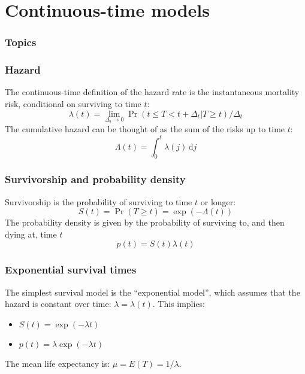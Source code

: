 \documentclass[color=usenames,dvipsnames]{beamer}\usepackage[]{graphicx}\usepackage[]{xcolor}
\begin{document}
\section{Continuous-time models}



\begin{frame}[plain]
  \frametitle{Topics}
  \Large
  \tableofcontents[currentsection]
\end{frame}


\begin{frame}
  \frametitle{Hazard}
  The continuous-time definition of the hazard rate is the
  instantaneous mortality risk, conditional on surviving to time $t$:
  \[
    \lambda(t) = \lim_{\Delta_t \to 0} \Pr(t \le T < t+\Delta_t | T\ge t)/\Delta_t
  \]
  \pause
  \vfill
  The cumulative hazard can be thought of as the sum of the risks up
  to time $t$:
  \[
    \Lambda(t) = \int_{0}^t \lambda(j) \,\mathrm{d}j
  \]
\end{frame}


\begin{frame}
  \frametitle{Survivorship and probability density}
  Survivorship is the probability of surviving to time $t$ or longer:
  \[
    S(t) = \Pr(T \ge t) = \exp(-\Lambda(t))
    \]
  \pause
  \vfill
  The probability density is given by the probability of surviving to,
  and then dying at, time $t$
  \[
    p(t) = S(t)\lambda(t) %
  \]
\end{frame}



\begin{frame}
  \frametitle{Exponential survival times}
  The simplest survival model is the ``exponential model'',
  which assumes that the hazard is constant over
  time: $\lambda = \lambda(t)$.
  \pause
  \vfill
  This implies:
  \begin{itemize}
    \item $S(t) = \exp(-\lambda t)$
    \item $p(t) = \lambda \exp(-\lambda t)$
  \end{itemize}
  \pause
  \vfill
  The mean life expectancy is: $\mu = E(T) = 1/\lambda$. 
\end{frame}
\end{document}

